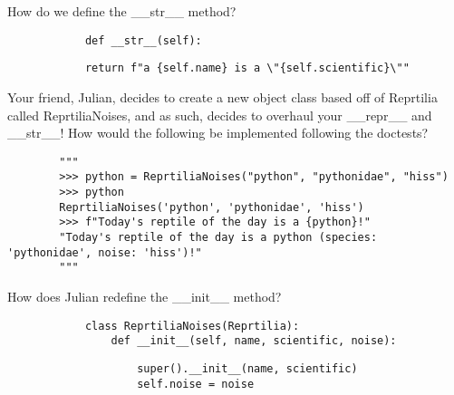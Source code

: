 \begin{blocksection}
    \question How do we define the __str__ method?

    \vspace{1.5\baselineskip}

    \begin{lstlisting}
            def __str__(self):
    \end{lstlisting}
    \begin{solution}[0.25in]
    \begin{lstlisting}
            return f"a {self.name} is a \"{self.scientific}\""
    \end{lstlisting}
    \end{solution}
\end{blocksection}

\begin{blocksection}
    \question Your friend, Julian, decides to create a new object class based off of Reprtilia called ReprtiliaNoises, and as such, decides to overhaul your __repr__ and __str__! How would the following be implemented following the doctests?
    
    \vspace{1.5\baselineskip}

    \begin{lstlisting}
        """
        >>> python = ReprtiliaNoises("python", "pythonidae", "hiss")
        >>> python
        ReprtiliaNoises('python', 'pythonidae', 'hiss')
        >>> f"Today's reptile of the day is a {python}!"
        "Today's reptile of the day is a python (species: 'pythonidae', noise: 'hiss')!"
        """
    \end{lstlisting}

    \begin{blocksection}
        \question How does Julian redefine the __init__ method?
    
        \vspace{1.5\baselineskip}
        
        \begin{lstlisting}
            class ReprtiliaNoises(Reprtilia):
                def __init__(self, name, scientific, noise):
        \end{lstlisting}
        \begin{solution}[0.25in]
        \begin{lstlisting}
                    super().__init__(name, scientific)
                    self.noise = noise
        \end{lstlisting}
        \end{solution}
    \end{blocksection}    
    

\end{blocksection}
